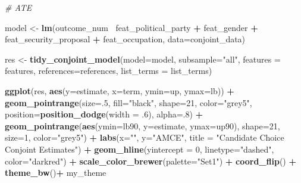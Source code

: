 \documentclass[12pt,]{article}
\newenvironment{Shaded}{\begin{snugshade}}{\end{snugshade}}
\newcommand{\CommentTok}[1]{\textcolor[rgb]{0.56,0.35,0.01}{\textit{#1}}}
\newcommand{\DataTypeTok}[1]{\textcolor[rgb]{0.13,0.29,0.53}{#1}}
\newcommand{\DecValTok}[1]{\textcolor[rgb]{0.00,0.00,0.81}{#1}}
\newcommand{\FloatTok}[1]{\textcolor[rgb]{0.00,0.00,0.81}{#1}}
\newcommand{\KeywordTok}[1]{\textcolor[rgb]{0.13,0.29,0.53}{\textbf{#1}}}
\newcommand{\NormalTok}[1]{#1}
\newcommand{\OperatorTok}[1]{\textcolor[rgb]{0.81,0.36,0.00}{\textbf{#1}}}
\newcommand{\StringTok}[1]{\textcolor[rgb]{0.31,0.60,0.02}{#1}}
\begin{document}
\begin{Shaded}
\begin{Highlighting}[]
\CommentTok{# ATE}

\NormalTok{model <-}\StringTok{ }\KeywordTok{lm}\NormalTok{(outcome_num}\OperatorTok{~}\StringTok{ }\NormalTok{feat_political_party }\OperatorTok{+}\StringTok{ }\NormalTok{feat_gender }\OperatorTok{+}\StringTok{ }
\StringTok{     }\NormalTok{feat_security_proposal }\OperatorTok{+}\StringTok{ }\NormalTok{feat_occupation, }\DataTypeTok{data=}\NormalTok{conjoint_data)}

\NormalTok{res <-}\StringTok{ }\KeywordTok{tidy_conjoint_model}\NormalTok{(}\DataTypeTok{model=}\NormalTok{model, }\DataTypeTok{subsample=}\StringTok{"all"}\NormalTok{, }\DataTypeTok{features =}\NormalTok{ features,}
                           \DataTypeTok{references=}\NormalTok{references, }\DataTypeTok{list_terms =}\NormalTok{ list_terms)}

\KeywordTok{ggplot}\NormalTok{(res, }\KeywordTok{aes}\NormalTok{(}\DataTypeTok{y=}\NormalTok{estimate, }\DataTypeTok{x=}\NormalTok{term, }
                \DataTypeTok{ymin=}\NormalTok{up, }\DataTypeTok{ymax=}\NormalTok{lb)) }\OperatorTok{+}
\StringTok{  }\KeywordTok{geom_pointrange}\NormalTok{(}\DataTypeTok{size=}\NormalTok{.}\DecValTok{5}\NormalTok{, }\DataTypeTok{fill=}\StringTok{"black"}\NormalTok{, }\DataTypeTok{shape=}\DecValTok{21}\NormalTok{, }\DataTypeTok{color=}\StringTok{"grey5"}\NormalTok{,}
                  \DataTypeTok{position=}\KeywordTok{position_dodge}\NormalTok{(}\DataTypeTok{width =} \FloatTok{.6}\NormalTok{), }\DataTypeTok{alpha=}\NormalTok{.}\DecValTok{8}\NormalTok{) }\OperatorTok{+}
\StringTok{  }\KeywordTok{geom_pointrange}\NormalTok{(}\KeywordTok{aes}\NormalTok{(}\DataTypeTok{ymin=}\NormalTok{lb90, }\DataTypeTok{y=}\NormalTok{estimate, }\DataTypeTok{ymax=}\NormalTok{up90), }\DataTypeTok{shape=}\DecValTok{21}\NormalTok{, }
                  \DataTypeTok{size=}\DecValTok{1}\NormalTok{, }\DataTypeTok{color=}\StringTok{"grey5"}\NormalTok{) }\OperatorTok{+}
\StringTok{  }\KeywordTok{labs}\NormalTok{(}\DataTypeTok{x=}\StringTok{""}\NormalTok{, }\DataTypeTok{y=}\StringTok{"AMCE"}\NormalTok{, }
       \DataTypeTok{title =} \StringTok{"Candidate Choice Conjoint Estimates"}\NormalTok{) }\OperatorTok{+}
\StringTok{  }\KeywordTok{geom_hline}\NormalTok{(}\DataTypeTok{yintercept =} \DecValTok{0}\NormalTok{, }\DataTypeTok{linetype=}\StringTok{"dashed"}\NormalTok{, }\DataTypeTok{color=}\StringTok{"darkred"}\NormalTok{) }\OperatorTok{+}\StringTok{ }
\StringTok{  }\KeywordTok{scale_color_brewer}\NormalTok{(}\DataTypeTok{palette=}\StringTok{"Set1"}\NormalTok{) }\OperatorTok{+}
\StringTok{  }\KeywordTok{coord_flip}\NormalTok{() }\OperatorTok{+}\StringTok{ }
\StringTok{  }\KeywordTok{theme_bw}\NormalTok{()}\OperatorTok{+}\StringTok{ }\NormalTok{my_theme}
\end{Highlighting}
\end{Shaded}
\end{document}
